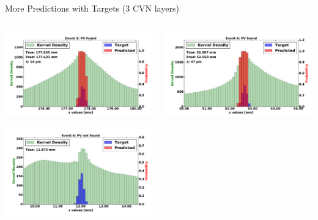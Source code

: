 \begin{frame}{More Predictions with Targets (3 CVN layers)}
  \begin{columns}[c]
        \begin{center}
            \includegraphics[width=1\textwidth,height=0.45\textwidth, trim=18 0 18 0]{images/120000_3layer_36.pdf}

            \includegraphics[width=1\textwidth, height=0.45\textwidth,trim=18 0 18 0]{images/120000_3layer_37.pdf}

        \end{center}
        \begin{center}
           \includegraphics[width=1\textwidth, height=0.45\textwidth, trim=18 0 18 0]{images/120000_3layer_38.pdf}


\end{center}
\end{columns}
\end{frame}
